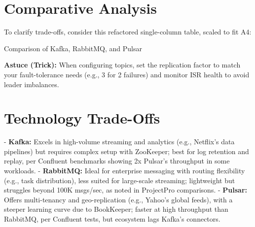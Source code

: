 \documentclass[12pt,a4paper]{report}
\begin{document}
\section{Comparative Analysis}
To clarify trade-offs, consider this refactored single-column table, scaled to fit A4:

\begin{center}
\caption{Comparison of Kafka, RabbitMQ, and Pulsar}
\end{center}

\begin{framed}
\textbf{Astuce (Trick):} When configuring topics, set the replication factor to match your fault-tolerance needs (e.g., 3 for 2 failures) and monitor ISR health to avoid leader imbalances.
\end{framed}

\section{Technology Trade-Offs}
- \textbf{Kafka:} Excels in high-volume streaming and analytics (e.g., Netflix's data pipelines) but requires complex setup with ZooKeeper; best for log retention and replay, per Confluent benchmarks showing 2x Pulsar's throughput in some workloads.
- \textbf{RabbitMQ:} Ideal for enterprise messaging with routing flexibility (e.g., task distribution), less suited for large-scale streaming; lightweight but struggles beyond 100K msgs/sec, as noted in ProjectPro comparisons.
- \textbf{Pulsar:} Offers multi-tenancy and geo-replication (e.g., Yahoo's global feeds), with a steeper learning curve due to BookKeeper; faster at high throughput than RabbitMQ, per Confluent tests, but ecosystem lags Kafka's connectors.
\end{document}
